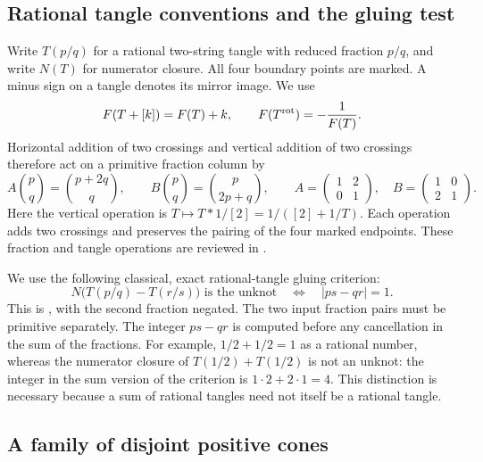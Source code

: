 \documentclass[11pt,a4paper]{article}
\theoremstyle{definition}
\theoremstyle{remark}
\numberwithin{equation}{section}
\begin{document}
\subsection{Rational tangle conventions and the gluing test}

Write $T(p/q)$ for a rational two-string tangle with reduced fraction $p/q$,
and write $N(T)$ for numerator closure.  All four boundary points are
marked.  A minus sign on a tangle denotes its mirror image.  We use
\[
 F(T+[k])=F(T)+k,
 \qquad F(T^{\rm rot})=-\frac1{F(T)}.
\]
Horizontal addition of two crossings and vertical addition of two crossings
therefore act on a primitive fraction column by
\begin{equation}
 A\binom pq=\binom{p+2q}{q},\qquad
 B\binom pq=\binom p{2p+q},\qquad
 A=\begin{pmatrix}1&2\\0&1\end{pmatrix},\quad
 B=\begin{pmatrix}1&0\\2&1\end{pmatrix}.
 \label{eq:rational-two-twist-generators}
\end{equation}
Here the vertical operation is
$T\mapsto T*1/[2]=1/([2]+1/T)$.
Each operation adds two crossings and preserves the pairing of the four
marked endpoints.  These fraction and tangle operations are reviewed in
\cite[Section~2]{KauffmanLambropoulouHard}.

We use the following classical, exact rational-tangle gluing criterion:
\begin{equation}
 N\bigl(T(p/q)-T(r/s)\bigr)\text{ is the unknot}
 \quad\Longleftrightarrow\quad |ps-qr|=1.
 \label{eq:rational-unknot-gluing}
\end{equation}
This is \cite[Theorem~5]{KauffmanLambropoulouHard}, with the second fraction
negated.  The two input fraction pairs must be primitive separately.
The integer $ps-qr$ is computed before any cancellation in the sum of the
fractions.  For example, $1/2+1/2=1$ as a rational number, whereas the
numerator closure of $T(1/2)+T(1/2)$ is not an unknot: the integer in the
sum version of the criterion is $1\cdot2+2\cdot1=4$.
This distinction is necessary because a sum of rational tangles need not
itself be a rational tangle.

\subsection{A family of disjoint positive cones}
\end{document}
